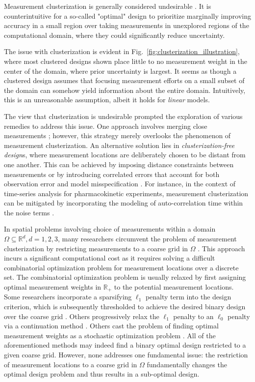 Measurement clusterization is generally considered undesirable
\citet{fedorov1996, nyberg2012, fedorov1997, Ucinski05,
  neitzel2019sparse}. It is counterintuitive for a so-called "optimal"
design to prioritize marginally improving accuracy in a small region
over taking measurements in unexplored regions of the computational
domain, where they could significantly reduce uncertainty.

The issue with clusterization is evident in
Fig.~\ref{fig:clusterization_illustration}, where most clustered
designs shown place little to no measurement weight in the center of
the domain, where prior uncertainty is largest. It seems as though a
clustered design assumes that focusing measurement efforts on a small
subset of the domain can somehow yield information about the entire
domain. Intuitively, this is an unreasonable assumption, albeit it
holds for \emph{linear} models.

The view that clusterization is undesirable prompted the exploration
of various remedies to address this issue. One approach involves
merging close measurements \citet{fedorov1997}; however, this strategy
merely overlooks the phenomenon of measurement clusterization. An
alternative solution lies in \emph{clusterization-free design}s, where
measurement locations are deliberately chosen to be distant from one
another. This can be achieved by imposing distance constraints between
measurements or by introducing correlated errors that account for both
observation error and model misspecification \citet{Ucinski05}. For
instance, in the context of time-series analysis for pharmacokinetic
experiments, measurement clusterization can be mitigated by
incorporating the modeling of auto-correlation time within the noise
terms \citet{nyberg2012}.


In spatial problems involving choice of measurements within a domain
\(\Omega \subseteq \mathbb{R}^d, d=1,2,3\), many researchers
circumvent the problem of measurement clusterization by restricting
measurements to a coarse grid in \(\Omega\) \citet{koval2020,
  alexanderian2021, attia2022, alexanderian2014, alexanderian2016,
  alexanderian2018efficient, brunton2016}. This approach incurs a
significant computational cost as it requires solving a difficult
combinatorial optimization problem for measurement locations over a
discrete set. The combinatorial optimization problem is usually
relaxed by first assigning optimal measurement weights in
\(\mathbb{R}_+\) to the potential measurement locations. Some
researchers incorporate a sparsifying \(\ell_1\) penalty term into the
design criterion, which is subsequently thresholded to achieve the
desired binary design over the coarse grid
\citet{horesh2008borehole}. Others progressively relax the \(\ell_1\)
penalty to an \(\ell_0\) penalty via a continuation method
\citet{alexanderian2016, alexanderian2014}. Others cast the problem of
finding optimal measurement weights as a stochastic optimization
problem \citet{attia2022stochastic}. All of the aforementioned methods
may indeed find a binary optimal design restricted to a given coarse
grid. However, none addresses one fundamental issue: the restriction
of measurement locations to a coarse grid in \(\Omega\) fundamentally
changes the optimal design problem and thus results in a sub-optimal
design.

